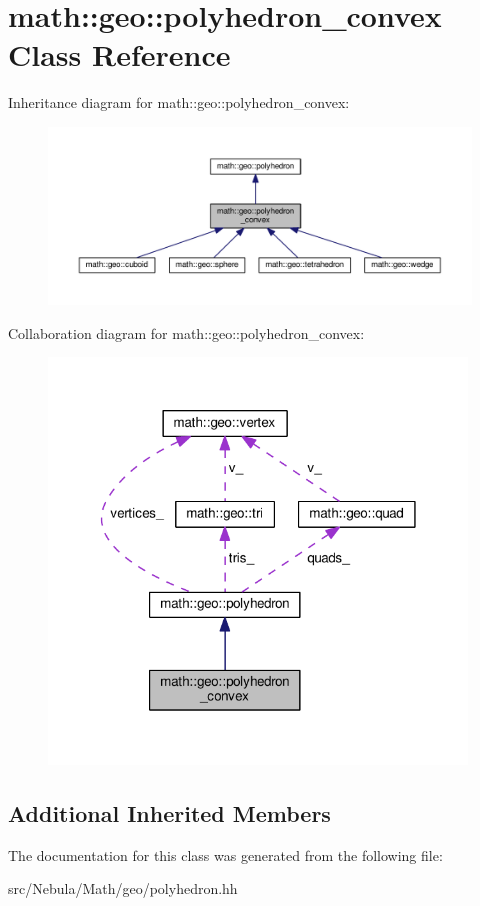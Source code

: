 \hypertarget{classmath_1_1geo_1_1polyhedron__convex}{\section{math\-:\-:geo\-:\-:polyhedron\-\_\-convex Class Reference}
\label{classmath_1_1geo_1_1polyhedron__convex}
}


Inheritance diagram for math\-:\-:geo\-:\-:polyhedron\-\_\-convex\-:
\nopagebreak
\begin{figure}[H]
\begin{center}
\leavevmode
\includegraphics[width=350pt]{classmath_1_1geo_1_1polyhedron__convex__inherit__graph}
\end{center}
\end{figure}


Collaboration diagram for math\-:\-:geo\-:\-:polyhedron\-\_\-convex\-:
\nopagebreak
\begin{figure}[H]
\begin{center}
\leavevmode
\includegraphics[width=315pt]{classmath_1_1geo_1_1polyhedron__convex__coll__graph}
\end{center}
\end{figure}
\subsection*{Additional Inherited Members}


The documentation for this class was generated from the following file\-:\begin{DoxyCompactItemize}
\item 
src/\-Nebula/\-Math/geo/polyhedron.\-hh\end{DoxyCompactItemize}

